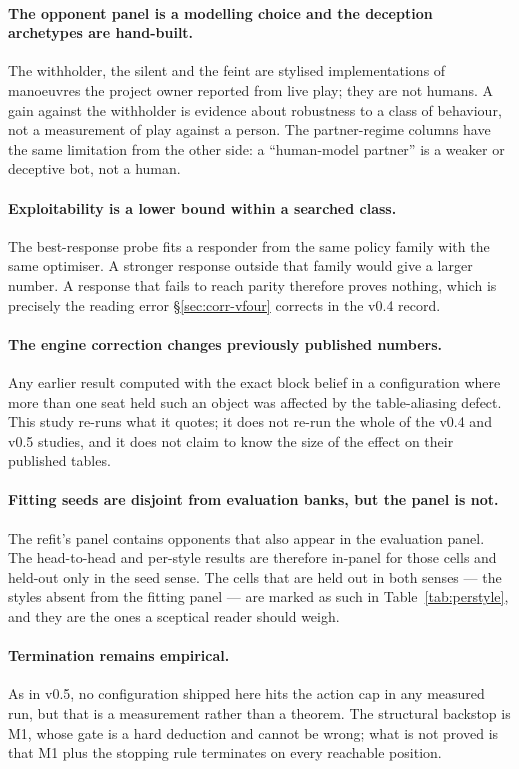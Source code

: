 \paragraph{The opponent panel is a modelling choice and the deception archetypes are hand-built.}
The withholder, the silent and the feint are stylised implementations of manoeuvres the project
owner reported from live play; they are not humans. A gain against the withholder is evidence about
robustness to a class of behaviour, not a measurement of play against a person. The partner-regime
columns have the same limitation from the other side: a ``human-model partner'' is a weaker or
deceptive bot, not a human.

\paragraph{Exploitability is a lower bound within a searched class.}
The best-response probe fits a responder from the same policy family with the same optimiser. A
stronger response outside that family would give a larger number. A response that fails to reach
parity therefore proves nothing, which is precisely the reading error \S\ref{sec:corr-vfour}
corrects in the v0.4 record.

\paragraph{The engine correction changes previously published numbers.}
Any earlier result computed with the exact block belief in a configuration where more than one seat
held such an object was affected by the table-aliasing defect. This study re-runs what it quotes;
it does not re-run the whole of the v0.4 and v0.5 studies, and it does not claim to know the size of
the effect on their published tables.

\paragraph{Fitting seeds are disjoint from evaluation banks, but the panel is not.}
The refit's panel contains opponents that also appear in the evaluation panel. The head-to-head and
per-style results are therefore in-panel for those cells and held-out only in the seed sense. The
cells that are held out in both senses --- the styles absent from the fitting panel --- are marked
as such in Table~\ref{tab:perstyle}, and they are the ones a sceptical reader should weigh.

\paragraph{Termination remains empirical.}
As in v0.5, no configuration shipped here hits the action cap in any measured run, but that is a
measurement rather than a theorem. The structural backstop is M1, whose gate is a hard deduction and
cannot be wrong; what is not proved is that M1 plus the stopping rule terminates on every reachable
position.
